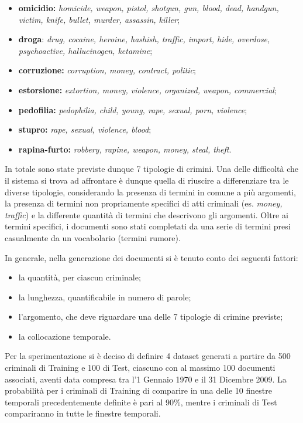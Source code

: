 \begin{itemize}
	\item \textbf{omicidio:} \emph{homicide, weapon, pistol, shotgun, gun, blood, dead, handgun, victim, knife, bullet, murder, assassin, killer};
	\item \textbf{droga}: \emph{drug, cocaine, heroine, hashish, traffic, import, hide, overdose, psychoactive, hallucinogen, ketamine};
	\item \textbf{corruzione:} \emph{corruption, money, contract, politic};
	\item \textbf{estorsione:} \emph{extortion, money, violence, organized, weapon, commercial};
	\item \textbf{pedofilia:} \emph{pedophilia, child, young, rape, sexual, porn, violence};
	\item \textbf{stupro:} \emph{rape, sexual, violence, blood};
	\item \textbf{rapina-furto:} \emph{robbery, rapine, weapon, money, steal, theft}.
\end{itemize}

In totale sono state previste dunque 7 tipologie di crimini. Una delle difficoltà che il sistema si trova ad affrontare è dunque quella di riuscire a differenziare tra le diverse tipologie, considerando la presenza di termini in comune a più argomenti, la presenza di termini non propriamente specifici di atti criminali (es. \emph{money, traffic}) e la differente quantità di termini che descrivono gli argomenti. Oltre ai termini specifici, i documenti sono stati completati da una serie di termini presi casualmente da un vocabolario (termini rumore). 

In generale, nella generazione dei documenti si è tenuto conto dei seguenti fattori: 
\begin{itemize}
	\item la quantità, per ciascun criminale;
	\item la lunghezza, quantificabile in numero di parole;
	\item l'argomento, che deve riguardare una delle 7 tipologie di crimine previste;
	\item la collocazione temporale.
\end{itemize}
Per la sperimentazione si è deciso di definire 4 dataset generati a partire da 500 criminali di Training e 100 di Test, ciascuno con al massimo 100 documenti associati, aventi data compresa tra l'1 Gennaio 1970 e il 31 Dicembre 2009. La probabilità per i criminali di Training di comparire in una delle 10 finestre temporali precedentemente definite è pari al 90\%, mentre i criminali di Test compariranno in tutte le finestre temporali.
 
